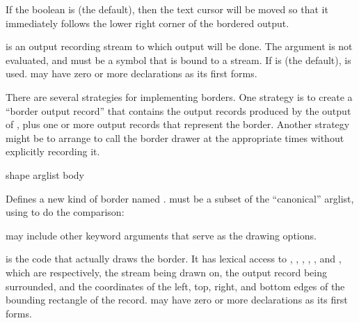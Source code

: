 If the boolean  is  (the default), then the text
cursor will be moved so that it immediately follows the lower right corner of
the bordered output.

 is an output recording stream to which output will be done.
The  argument is not evaluated, and must be a symbol that is
bound to a stream.  If  is  (the default),
 is used.   may have zero or more
declarations as its first forms.

There are several strategies for implementing borders.  One strategy is to
create a ``border output record'' that contains the output records produced by
the output of , plus one or more output records that represent the
border.  Another strategy might be to arrange to call the border drawer at the
appropriate times without explicitly recording it.


 {shape arglist \body body}

Defines a new kind of border named .   must be a subset
of the ``canonical'' arglist, using  to do the
comparison:


 may include other keyword arguments that serve as the drawing options.

 is the code that actually draws the border.  It has lexical access to
, , , , , and ,
which are respectively, the stream being drawn on, the output record being
surrounded, and the coordinates of the left, top, right, and bottom edges of the
bounding rectangle of the record.   may have zero or more declarations
as its first forms.
